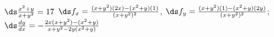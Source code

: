{$\ds \frac{x^2+y}{x+y^2}=17$}
{$\ds f_x = \frac{(x+y^2)(2x)-(x^2+y)(1)}{(x+y^2)^2}$, $\ds f_y = \frac{(x+y^2)(1)-(x^2+y)(2y)}{(x+y^2)^2}$;\\
$\ds\frac{dy}{dx} = -\frac{2x(x+y^2)-(x^2+y)}{x+y^2-2y(x^2+y)}$
}
